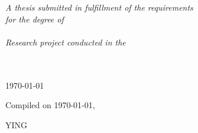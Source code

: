 \documentclass[
11pt, %
american, %
singlespacing, %
parskip, %
headsepline, %
table,
dvipsnames
]{MastersDoctoralThesis} %
\begin{document}
\begin{titlepage}
\begin{center}
\vfill

\large \textit{A thesis submitted in fulfillment of the requirements\\ for the degree of }\\
\large \textit{\degreename}\\[0.5cm] %
\textit{Research project conducted in the}\\
\groupname\\\deptname\\[2cm] %
 
\vfill

{\large \today}\\[3cm] %
 
\vfill
\end{center}
\end{titlepage}

\ifdefined\drafting
	\vspace*{0.2\textheight}
	\drafting

	Compiled on
	\noindent \today, \currenttime
	\bigbreak

	\hfill YING
\else
\fi
\ifdefined\drafting
\else
\fi


\ifdefined\drafting
\else
\fi






\ifdefined\drafting
\else


\end{document}
